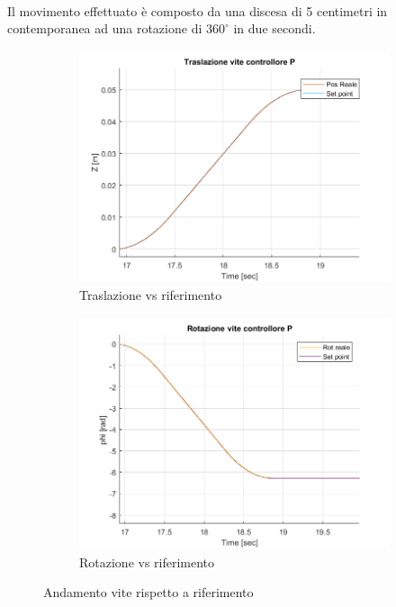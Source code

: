 \\Il movimento effettuato è composto da una discesa di 5 centimetri in contemporanea ad una rotazione di $360^\circ$ in due secondi.
\begin{figure}
	\centering
	\begin{subfigure}{.45\textwidth}
		\centering
		\includegraphics[width=.8\linewidth]{Immagini/Traiettorie/TrasViteP}  
		\caption{Traslazione vs riferimento}
		\label{fig:sub-v0}
	\end{subfigure}
	\begin{subfigure}{.45\textwidth}
		\centering
		\includegraphics[width=.8\linewidth]{Immagini/Traiettorie/RotViteP}  
		\caption{Rotazione vs riferimento}
		\label{fig:sub-v01}
	\end{subfigure}
	\caption{Andamento vite rispetto a riferimento}
	\label{fig:ViteP}
\end{figure}
